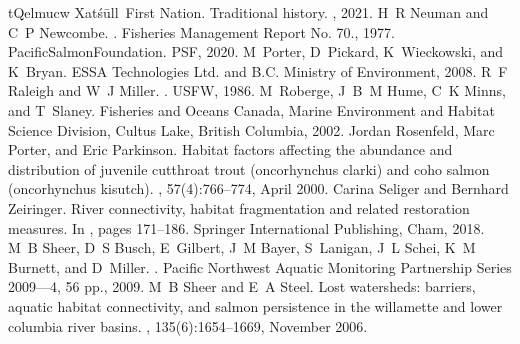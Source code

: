 \documentclass[letterpaper,10pt,english]{jupyterBook}
\begin{document}
\begin{sphinxthebibliography}{tQelmucw}
\sphinxAtStartPar
Xatśūll First Nation. Traditional history. , 2021.
\sphinxAtStartPar
H R Neuman and C P Newcombe. . Fisheries Management Report No. 70., 1977.
\sphinxAtStartPar
Pacific\sphinxhyphen{}Salmon\sphinxhyphen{}Foundation.  PSF, 2020.
\sphinxAtStartPar
M Porter, D Pickard, K Wieckowski, and K Bryan.  ESSA Technologies Ltd. and B.C. Ministry of Environment, 2008.
\sphinxAtStartPar
R F Raleigh and W J Miller. . USFW, 1986.
\sphinxAtStartPar
M Roberge, J B M Hume, C K Minns, and T Slaney.  Fisheries and Oceans Canada, Marine Environment and Habitat Science Division, Cultus Lake, British Columbia, 2002.
\sphinxAtStartPar
Jordan Rosenfeld, Marc Porter, and Eric Parkinson. Habitat factors affecting the abundance and distribution of juvenile cutthroat trout (oncorhynchus clarki) and coho salmon (oncorhynchus kisutch). , 57(4):766–774, April 2000.
\sphinxAtStartPar
Carina Seliger and Bernhard Zeiringer. River connectivity, habitat fragmentation and related restoration measures. In , pages 171–186. Springer International Publishing, Cham, 2018.
\sphinxAtStartPar
M B Sheer, D S Busch, E Gilbert, J M Bayer, S Lanigan, J L Schei, K M Burnett, and D Miller. . Pacific Northwest Aquatic Monitoring Partnership Series 2009—4, 56 pp., 2009.
\sphinxAtStartPar
M B Sheer and E A Steel. Lost watersheds: barriers, aquatic habitat connectivity, and salmon persistence in the willamette and lower columbia river basins. , 135(6):1654–1669, November 2006.

\end{sphinxthebibliography}
\end{document}
